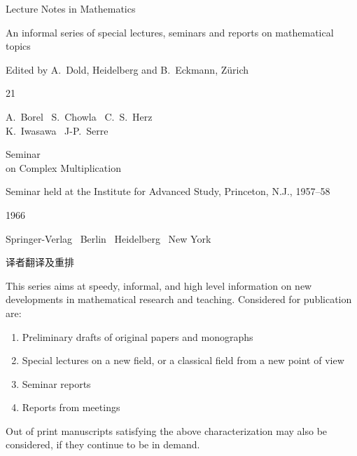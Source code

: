 \begin{titlepage}
  \centering
  \vspace*{1.5cm}
  {\large Lecture Notes in Mathematics\par}
  \vspace{0.6em}
  {\small An informal series of special lectures, seminars and reports on mathematical topics\par}
  \vspace{1.2em}
  {\small Edited by A.\ Dold, Heidelberg and B.\ Eckmann, Z\"urich\par}
  \vspace{3em}
  {\Large 21\par}
  \vspace{4em}
  {\normalsize A.\ Borel \textperiodcentered\ S.\ Chowla \textperiodcentered\ C.\ S.\ Herz\\
   K.\ Iwasawa \textperiodcentered\ J-P.\ Serre\par}
  \vspace{3em}
  {\huge Seminar\\[0.35em] on Complex Multiplication\par}
  \vspace{2.5em}
  {\small Seminar held at the Institute for Advanced Study, Princeton, N.J., 1957--58\par}
  \vspace{2em}
  {\normalsize 1966\par}
  \vfill
  Springer-Verlag \textperiodcentered\ Berlin \textperiodcentered\ Heidelberg \textperiodcentered\ New York
  \vspace{1.2em}

  {\large 译者\quad 翻译及重排\par}
\end{titlepage}

\noindent\frenchspacing
This series aims at speedy, informal, and high level information on new developments in mathematical research and teaching. Considered for publication are:
\begin{enumerate}[leftmargin=2.5em]
  \item Preliminary drafts of original papers and monographs
  \item Special lectures on a new field, or a classical field from a new point of view
  \item Seminar reports
  \item Reports from meetings
\end{enumerate}
Out of print manuscripts satisfying the above characterization may also be considered, if they continue to be in demand.

